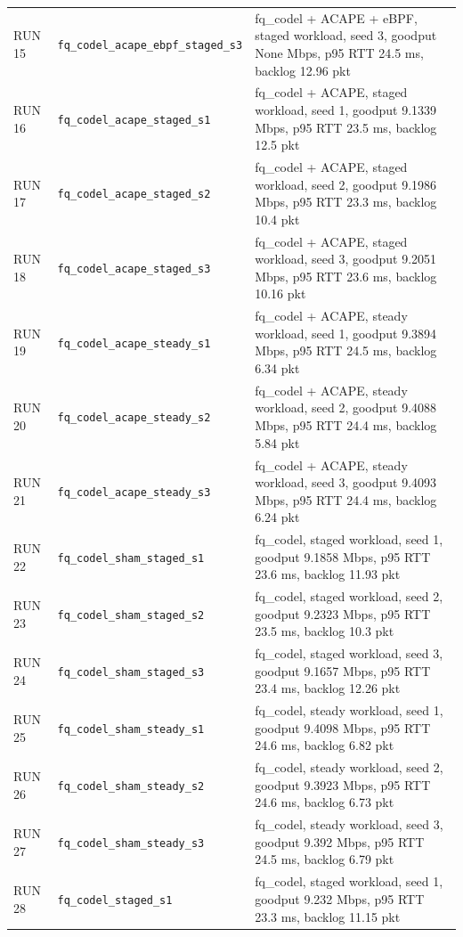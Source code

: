 \documentclass[11pt,a4paper]{article}
\begin{document}
\begin{longtable}{p{1.5cm}p{5.0cm}p{9.5cm}}
RUN 15 & \texttt{fq\_codel\_acape\_ebpf\_staged\_s3} & fq\_codel + ACAPE + eBPF, staged workload, seed 3, goodput None Mbps, p95 RTT 24.5 ms, backlog 12.96 pkt \\
RUN 16 & \texttt{fq\_codel\_acape\_staged\_s1} & fq\_codel + ACAPE, staged workload, seed 1, goodput 9.1339 Mbps, p95 RTT 23.5 ms, backlog 12.5 pkt \\
RUN 17 & \texttt{fq\_codel\_acape\_staged\_s2} & fq\_codel + ACAPE, staged workload, seed 2, goodput 9.1986 Mbps, p95 RTT 23.3 ms, backlog 10.4 pkt \\
RUN 18 & \texttt{fq\_codel\_acape\_staged\_s3} & fq\_codel + ACAPE, staged workload, seed 3, goodput 9.2051 Mbps, p95 RTT 23.6 ms, backlog 10.16 pkt \\
RUN 19 & \texttt{fq\_codel\_acape\_steady\_s1} & fq\_codel + ACAPE, steady workload, seed 1, goodput 9.3894 Mbps, p95 RTT 24.5 ms, backlog 6.34 pkt \\
RUN 20 & \texttt{fq\_codel\_acape\_steady\_s2} & fq\_codel + ACAPE, steady workload, seed 2, goodput 9.4088 Mbps, p95 RTT 24.4 ms, backlog 5.84 pkt \\
RUN 21 & \texttt{fq\_codel\_acape\_steady\_s3} & fq\_codel + ACAPE, steady workload, seed 3, goodput 9.4093 Mbps, p95 RTT 24.4 ms, backlog 6.24 pkt \\
RUN 22 & \texttt{fq\_codel\_sham\_staged\_s1} & fq\_codel, staged workload, seed 1, goodput 9.1858 Mbps, p95 RTT 23.6 ms, backlog 11.93 pkt \\
RUN 23 & \texttt{fq\_codel\_sham\_staged\_s2} & fq\_codel, staged workload, seed 2, goodput 9.2323 Mbps, p95 RTT 23.5 ms, backlog 10.3 pkt \\
RUN 24 & \texttt{fq\_codel\_sham\_staged\_s3} & fq\_codel, staged workload, seed 3, goodput 9.1657 Mbps, p95 RTT 23.4 ms, backlog 12.26 pkt \\
RUN 25 & \texttt{fq\_codel\_sham\_steady\_s1} & fq\_codel, steady workload, seed 1, goodput 9.4098 Mbps, p95 RTT 24.6 ms, backlog 6.82 pkt \\
RUN 26 & \texttt{fq\_codel\_sham\_steady\_s2} & fq\_codel, steady workload, seed 2, goodput 9.3923 Mbps, p95 RTT 24.6 ms, backlog 6.73 pkt \\
RUN 27 & \texttt{fq\_codel\_sham\_steady\_s3} & fq\_codel, steady workload, seed 3, goodput 9.392 Mbps, p95 RTT 24.5 ms, backlog 6.79 pkt \\
RUN 28 & \texttt{fq\_codel\_staged\_s1} & fq\_codel, staged workload, seed 1, goodput 9.232 Mbps, p95 RTT 23.3 ms, backlog 11.15 pkt \\

\end{longtable}
\end{document}
